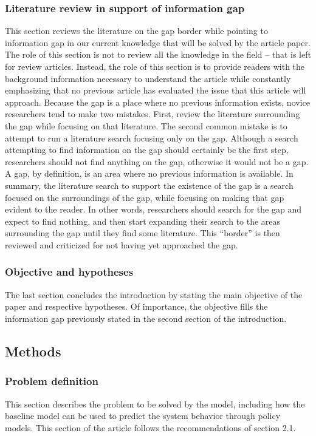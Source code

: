 \documentclass[11pt]{article}
\begin{document}
\subsubsection {Literature review in support of information gap}
This section reviews the literature on the gap border while pointing to information gap in our current knowledge that will be solved by the article paper. The role of this section is not to review all the knowledge in the field -- that is left for review articles. Instead, the role of this section is to provide readers with the background information necessary to understand the article while constantly emphasizing that no previous article has evaluated the issue that this article will approach. Because the gap is a place where no previous information exists, novice researchers tend to make two mistakes. First, review the literature surrounding the gap while focusing on that literature.  The second common mistake is to attempt to run a literature search focusing only on the gap. Although a search attempting to find information on the gap should certainly be the first step, researchers should not find anything on the gap, otherwise it would not be a gap. A gap, by definition, is an area where no previous information is available. In summary, the literature search to support the existence of the gap is a search focused on the surroundings of the gap, while focusing on making that gap evident to the reader. In other words, researchers should search for the gap and expect to find nothing, and then start expanding their search to the areas surrounding the gap until they find some literature. This ``border'' is then reviewed and criticized for not having yet approached the gap.

\subsubsection {Objective and hypotheses}
The last section concludes the introduction by stating the main objective of the paper and respective hypotheses. Of importance, the objective fills the information gap previously stated in the second section of the introduction.

\subsection {Methods}

\subsubsection {Problem definition}
This section describes the problem to be solved by the model, including how the baseline model can be used to predict the system behavior through policy models.  This section of the article follows the recommendations of section 2.1. 
\end{document}
